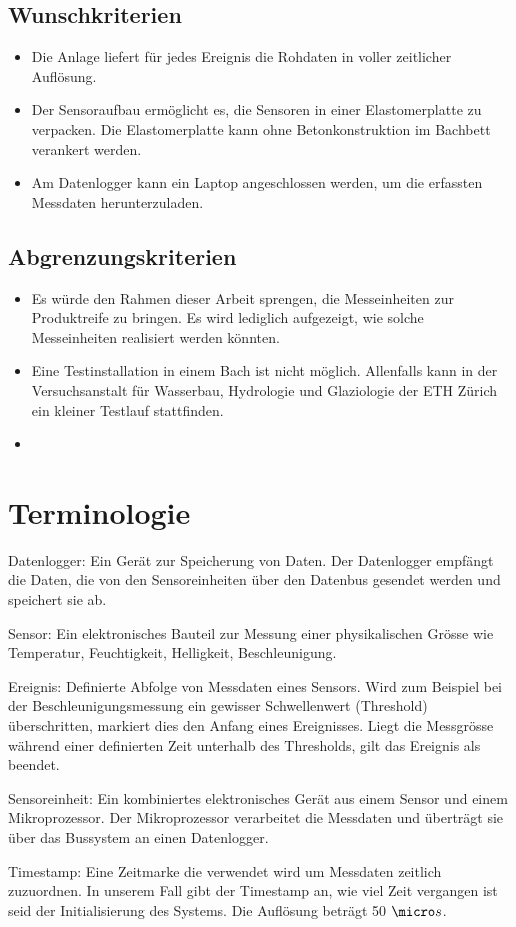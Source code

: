 \subsection{Wunschkriterien}
\begin{itemize}
\item Die Anlage liefert für jedes Ereignis die Rohdaten in voller zeitlicher Auflösung.
\item Der Sensoraufbau ermöglicht es, die Sensoren in einer Elastomerplatte zu verpacken. Die Elastomerplatte kann ohne Betonkonstruktion im Bachbett verankert werden.
\item Am Datenlogger kann ein Laptop angeschlossen werden, um die erfassten Messdaten herunterzuladen.
\end{itemize}
\subsection{Abgrenzungskriterien}
\begin{itemize}
\item Es würde den Rahmen dieser Arbeit sprengen, die Messeinheiten zur Produktreife zu bringen. Es wird lediglich aufgezeigt, wie solche Messeinheiten realisiert werden könnten.
\item Eine Testinstallation in einem Bach ist nicht möglich. Allenfalls kann in der Versuchsanstalt für Wasserbau, Hydrologie und Glaziologie der ETH Zürich ein kleiner Testlauf stattfinden.
\item
\end{itemize}

\section{Terminologie}\label{sec.terminologie}
\begin{description}
\item{Datenlogger}: Ein Gerät zur Speicherung von Daten. Der Datenlogger empfängt die Daten, die von den Sensoreinheiten über den Datenbus gesendet werden und speichert sie ab.
\item{Sensor}: Ein elektronisches Bauteil zur Messung einer physikalischen Grösse wie Temperatur, Feuchtigkeit, Helligkeit, Beschleunigung.
\item{Ereignis}: Definierte Abfolge von Messdaten eines Sensors. Wird zum Beispiel bei der Beschleunigungsmessung ein gewisser Schwellenwert (Threshold) überschritten, markiert dies den Anfang eines Ereignisses. Liegt die Messgrösse während einer definierten Zeit unterhalb des Thresholds, gilt das Ereignis als beendet.
\item{Sensoreinheit}: Ein kombiniertes elektronisches Gerät aus einem Sensor und einem Mikroprozessor. Der Mikroprozessor verarbeitet die Messdaten und überträgt sie über das Bussystem an einen Datenlogger.
\item{Timestamp}:  Eine Zeitmarke die verwendet wird um Messdaten zeitlich zuzuordnen. In unserem Fall gibt der Timestamp an, wie viel Zeit vergangen ist seid der Initialisierung des Systems. Die Auflösung beträgt 50 $\micro s$.
\end{description}